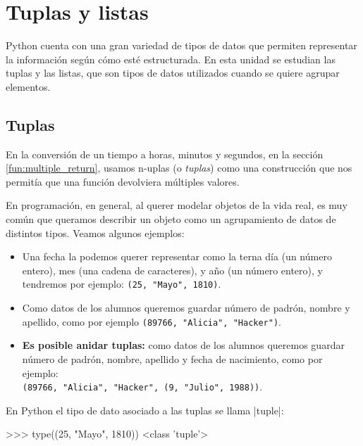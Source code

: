 \chapter{Tuplas y listas}

Python cuenta con una gran variedad de tipos de datos que permiten
representar la información según cómo esté estructurada.  En esta unidad se
estudian las tuplas y las listas, que son tipos de datos utilizados cuando
se quiere agrupar elementos.

\section{Tuplas}

En la conversión de un tiempo a horas, minutos y segundos, en la sección
\ref{fun:multiple_return}, usamos n-uplas (o {\it tuplas}) como una
construcción que nos permitía que una función devolviera múltiples valores.

En programación, en general, al querer modelar objetos de la vida real, es
muy común que queramos describir un objeto como un agrupamiento de datos
de distintos tipos. Veamos algunos ejemplos:

\begin{itemize}

\item Una fecha la podemos querer representar como la terna día (un número
entero), mes (una cadena de caracteres), y año (un número entero), y
tendremos por ejemplo: \lstinline!(25, "Mayo", 1810)!.

\item Como datos de los alumnos queremos guardar número de padrón, nombre y
apellido, como por ejemplo \lstinline!(89766, "Alicia", "Hacker")!.

\item {\bf Es posible anidar tuplas:} como datos de los alumnos
queremos guardar número de padrón, nombre, apellido y fecha de nacimiento,
como por ejemplo: \\
\lstinline!(89766, "Alicia", "Hacker", (9, "Julio", 1988))!.
\end{itemize}

\begin{observacion}
En Python el tipo de dato asociado a las tuplas se llama |tuple|:

\begin{codigo-python-sn}
>>> type((25, "Mayo", 1810))
<class 'tuple'>
\end{codigo-python-sn}
\end{observacion}

